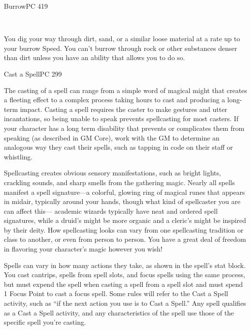 \documentclass[12pt,openany,twocolumn]{book}
\begin{document}
\begin{action}{Burrow}{}{PC 419}
    \begin{actioninfo}
         \\
    \end{actioninfo}

    \begin{actionbody}
        You dig your way through dirt, sand, or a similar loose material at a rate up to your burrow Speed. You can't burrow through rock or other substances denser than dirt unless you have an ability that allows you to do so.
    \end{actionbody}
\end{action}

\begin{action}{Cast a Spell}{}{PC 299}
    \begin{actionbody}
        The casting of a spell can range from a simple word of magical might that creates a fleeting effect to a complex process taking hours to cast and producing a long-term impact. Casting a spell requires the caster to make gestures and utter incantations, so being unable to speak prevents spellcasting for most casters. If your character has a long term disability that prevents or complicates them from speaking (as described in GM Core), work with the GM to determine an analogous way they cast their spells, such as tapping in code on their staff or whistling.

        Spellcasting creates obvious sensory manifestations, such as bright lights, crackling sounds, and sharp smells from the gathering magic. Nearly all spells manifest a spell signature—a colorful, glowing ring of magical runes that appears in midair, typically around your hands, though what kind of spellcaster you are can affect this— academic wizards typically have neat and ordered spell signatures, while a druid's might be more organic and a cleric's might be inspired by their deity. How spellcasting looks can vary from one spellcasting tradition or class to another, or even from person to person. You have a great deal of freedom in flavoring your character's magic however you wish!

        Spells can vary in how many actions they take, as shown in the spell's stat block. You cast cantrips, spells from spell slots, and focus spells using the same process, but must expend the spell when casting a spell from a spell slot and must spend 1 Focus Point to cast a focus spell. Some rules will refer to the Cast a Spell activity, such as ``if the next action you use is to Cast a Spell.'' Any spell qualifies as a Cast a Spell activity, and any characteristics of the spell use those of the specific spell you're casting.


\end{actionbody}
\end{action}
\end{document}
